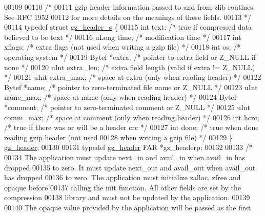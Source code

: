 \begin{DoxyCode}
00109 
00110 \textcolor{comment}{/*}
00111 \textcolor{comment}{     gzip header information passed to and from zlib routines.  See RFC 1952}
00112 \textcolor{comment}{  for more details on the meanings of these fields.}
00113 \textcolor{comment}{*/}
00114 \textcolor{keyword}{typedef} \textcolor{keyword}{struct }\hyperlink{structgz__header__s}{gz\_header\_s} \{
00115     \textcolor{keywordtype}{int}     text;       \textcolor{comment}{/* true if compressed data believed to be text */}
00116     uLong   time;       \textcolor{comment}{/* modification time */}
00117     \textcolor{keywordtype}{int}     xflags;     \textcolor{comment}{/* extra flags (not used when writing a gzip file) */}
00118     \textcolor{keywordtype}{int}     os;         \textcolor{comment}{/* operating system */}
00119     Bytef   *extra;     \textcolor{comment}{/* pointer to extra field or Z\_NULL if none */}
00120     uInt    extra\_len;  \textcolor{comment}{/* extra field length (valid if extra != Z\_NULL) */}
00121     uInt    extra\_max;  \textcolor{comment}{/* space at extra (only when reading header) */}
00122     Bytef   *name;      \textcolor{comment}{/* pointer to zero-terminated file name or Z\_NULL */}
00123     uInt    name\_max;   \textcolor{comment}{/* space at name (only when reading header) */}
00124     Bytef   *comment;   \textcolor{comment}{/* pointer to zero-terminated comment or Z\_NULL */}
00125     uInt    comm\_max;   \textcolor{comment}{/* space at comment (only when reading header) */}
00126     \textcolor{keywordtype}{int}     hcrc;       \textcolor{comment}{/* true if there was or will be a header crc */}
00127     \textcolor{keywordtype}{int}     done;       \textcolor{comment}{/* true when done reading gzip header (not used}
00128 \textcolor{comment}{                           when writing a gzip file) */}
00129 \} \hyperlink{structgz__header__s}{gz\_header};
00130 
00131 \textcolor{keyword}{typedef} \hyperlink{structgz__header__s}{gz\_header} FAR *gz\_headerp;
00132 
00133 \textcolor{comment}{/*}
00134 \textcolor{comment}{     The application must update next\_in and avail\_in when avail\_in has dropped}
00135 \textcolor{comment}{   to zero.  It must update next\_out and avail\_out when avail\_out has dropped}
00136 \textcolor{comment}{   to zero.  The application must initialize zalloc, zfree and opaque before}
00137 \textcolor{comment}{   calling the init function.  All other fields are set by the compression}
00138 \textcolor{comment}{   library and must not be updated by the application.}
00139 \textcolor{comment}{}
00140 \textcolor{comment}{     The opaque value provided by the application will be passed as the first}

\end{DoxyCode}
